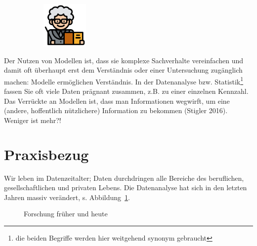 \documentclass[
  a4paper,
  DIV=11]{scrreprt}
\theoremstyle{definition}
\theoremstyle{definition}
\theoremstyle{definition}
\theoremstyle{remark}
\begin{document}
\begin{figure}
\begin{minipage}{0.44\linewidth}
\begin{figure}[H]

{\centering \includegraphics[width=0.25\textwidth,height=\textheight]{img/teacher.png}

}


\end{figure}%

\end{minipage}%

\end{figure}%

Der Nutzen von Modellen ist, dass sie komplexe Sachverhalte vereinfachen
und damit oft überhaupt erst dem Verständnis oder einer Untersuchung
zugänglich machen: Modelle ermöglichen Verständnis. In der Datenanalyse
bzw. Statistik\footnote{die beiden Begriffe werden hier weitgehend
  synonym gebraucht} fassen Sie oft viele Daten prägnant zusammen, z.B.
zu einer einzelnen Kennzahl. Das Verrückte an Modellen ist, dass man
Informationen wegwirft, um eine (andere, hoffentlich nützlichere)
Information zu bekommen (Stigler 2016). Weniger ist mehr?!

\section{Praxisbezug}\label{praxisbezug}

Wir leben im Datenzeitalter; Daten durchdringen alle Bereiche des
beruflichen, gesellschaftlichen und privaten Lebens. Die Datenanalyse
hat sich in den letzten Jahren massiv verändert, s.
Abbildung~\ref{fig-fo-früher-heute}.

\begin{figure}


\caption{\label{fig-fo-früher-heute}Forschung früher und heute}

\end{figure}%
\end{document}
